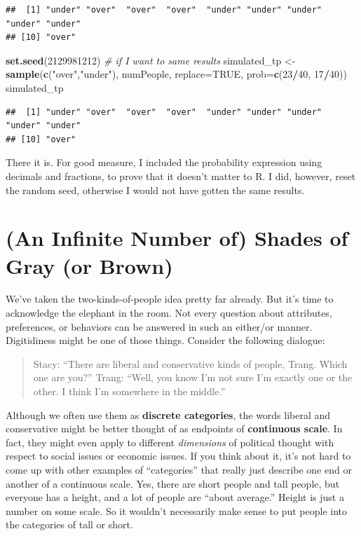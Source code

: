 \documentclass[openany]{book}
\newenvironment{Shaded}{\begin{snugshade}}{\end{snugshade}}
\newcommand{\CommentTok}[1]{\textcolor[rgb]{0.56,0.35,0.01}{\textit{#1}}}
\newcommand{\DataTypeTok}[1]{\textcolor[rgb]{0.13,0.29,0.53}{#1}}
\newcommand{\DecValTok}[1]{\textcolor[rgb]{0.00,0.00,0.81}{#1}}
\newcommand{\KeywordTok}[1]{\textcolor[rgb]{0.13,0.29,0.53}{\textbf{#1}}}
\newcommand{\NormalTok}[1]{#1}
\newcommand{\OperatorTok}[1]{\textcolor[rgb]{0.81,0.36,0.00}{\textbf{#1}}}
\newcommand{\OtherTok}[1]{\textcolor[rgb]{0.56,0.35,0.01}{#1}}
\newcommand{\StringTok}[1]{\textcolor[rgb]{0.31,0.60,0.02}{#1}}
\begin{document}
\begin{verbatim}
##  [1] "under" "over"  "over"  "over"  "under" "under" "under" "under" "under"
## [10] "over"
\end{verbatim}

\begin{Shaded}
\begin{Highlighting}[]
\KeywordTok{set.seed}\NormalTok{(}\DecValTok{2129981212}\NormalTok{) }\CommentTok{# if I want to same results}
\NormalTok{simulated_tp <-}\StringTok{ }\KeywordTok{sample}\NormalTok{(}\KeywordTok{c}\NormalTok{(}\StringTok{"over"}\NormalTok{,}\StringTok{"under"}\NormalTok{), numPeople, }\DataTypeTok{replace=}\OtherTok{TRUE}\NormalTok{, }\DataTypeTok{prob=}\KeywordTok{c}\NormalTok{(}\DecValTok{23}\OperatorTok{/}\DecValTok{40}\NormalTok{, }\DecValTok{17}\OperatorTok{/}\DecValTok{40}\NormalTok{))}
\NormalTok{simulated_tp}
\end{Highlighting}
\end{Shaded}

\begin{verbatim}
##  [1] "under" "over"  "over"  "over"  "under" "under" "under" "under" "under"
## [10] "over"
\end{verbatim}

There it is. For good measure, I included the probability expression using decimals and fractions, to prove that it doesn't matter to R. I did, however, reset the random seed, otherwise I would not have gotten the same results.

\hypertarget{shades}{%
\chapter{(An Infinite Number of) Shades of Gray (or Brown)}\label{shades}}

We've taken the two-kinds-of-people idea pretty far already. But it's time to acknowledge the elephant in the room. Not every question about attributes, preferences, or behaviors can be answered in such an either/or manner. Digitidiness might be one of those things. Consider the following dialogue:

\begin{quote}
Stacy: ``There are liberal and conservative kinds of people, Trang. Which one are you?''
Trang: ``Well, you know I'm not sure I'm exactly one or the other. I think I'm somewhere in the middle.''
\end{quote}

Although we often use them as \textbf{discrete categories}, the words liberal and conservative might be better thought of as endpoints of \textbf{continuous scale}. In fact, they might even apply to different \emph{dimensions} of political thought with respect to social issues or economic issues. If you think about it, it's not hard to come up with other examples of ``categories'' that really just describe one end or another of a continuous scale. Yes, there are short people and tall people, but everyone has a height, and a lot of people are ``about average.'' Height is just a number on some scale. So it wouldn't necessarily make sense to put people into the categories of tall or short.
\end{document}
